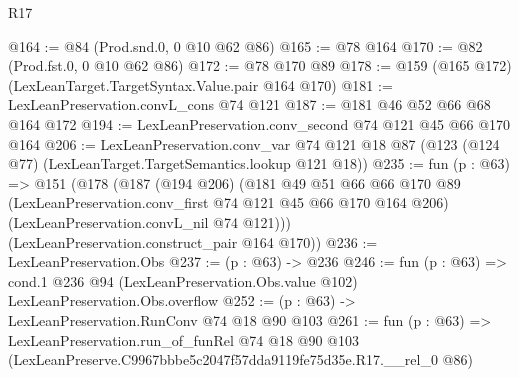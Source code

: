 \begin{lexlean}{R17}
\begin{coremodule}
@164 := @84 (Prod.snd.{0, 0} @10 @62 @86)
@165 := @78 @164
@170 := @82 (Prod.fst.{0, 0} @10 @62 @86)
@172 := @78 @170 @89
@178 := @159 (@165 @172) (LexLeanTarget.TargetSyntax.Value.pair @164 @170)
@181 := LexLeanPreservation.convL_cons @74 @121
@187 := @181 @46 @52 @66 @68 @164 @172
@194 := LexLeanPreservation.conv_second @74 @121 @45 @66 @170 @164
@206 := LexLeanPreservation.conv_var
    @74
    @121
    @18
    @87
    (@123 (@124 @77) (LexLeanTarget.TargetSemantics.lookup @121 @18))
@235 := fun (p : @63) =>
  @151
    (@178
      (@187
        (@194 @206)
        (@181
          @49
          @51
          @66
          @66
          @170
          @89
          (LexLeanPreservation.conv_first @74 @121 @45 @66 @170 @164 @206)
          (LexLeanPreservation.convL_nil @74 @121)))
      (LexLeanPreservation.construct_pair @164 @170))
@236 := LexLeanPreservation.Obs
@237 := (p : @63) -> @236
@246 := fun (p : @63) =>
  cond.{1} @236 @94 (LexLeanPreservation.Obs.value @102) LexLeanPreservation.Obs.overflow
@252 := (p : @63) -> LexLeanPreservation.RunConv @74 @18 @90 @103
@261 := fun (p : @63) =>
  LexLeanPreservation.run_of_funRel
    @74
    @18
    @90
    @103
    (LexLeanPreserve.C9967bbbe5c2047f57dda9119fe75d35e.R17.__rel_0 @86)
\end{coremodule}
\end{lexlean}
